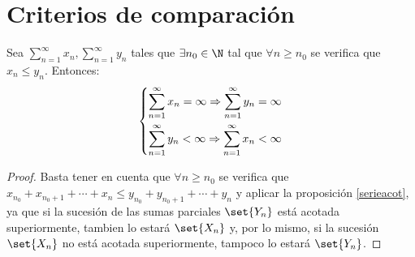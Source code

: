 \section{Criterios de comparación}
\begin{theorem}
	\label{1ercrit}
	Sea \(\sum\nolimits_{n =1}^{\infty} x_n, \sum\nolimits_{n =1}^{\infty} y_n \) tales que \(\exists n_0 \in \N \) tal que \(\forall n \geq n_0 \) se verifica que \(x_n \leq y_n \). Entonces:
	\[
		\begin{dcases}
			\sum_{n =1}^{\infty} x_n = \infty \Rightarrow \sum_{n =1}^{\infty} y_n = \infty \\
			\sum_{n =1}^{\infty} y_n < \infty \Rightarrow \sum_{n =1}^{\infty} x_n < \infty
		\end{dcases}
	\]
\end{theorem}
\begin{proof}
	Basta tener en cuenta que \(\forall n \geq n_0\) se verifica que \(x_{n_0} + x_{n_0 + 1} + \cdots + x_n \leq y_{n_0} + y_{n_{0} +1} + \cdots + y_n  \) y aplicar la proposición \ref{serieacot}, ya que si la sucesión de las sumas parciales \(\set{Y_n }\) está acotada superiormente, tambien lo estará \(\set{X_n }\) y, por lo mismo, si la sucesión \(\set{X_n }\) no está acotada superiormente, tampoco lo estará \(\set{Y_n }\).
\end{proof}


